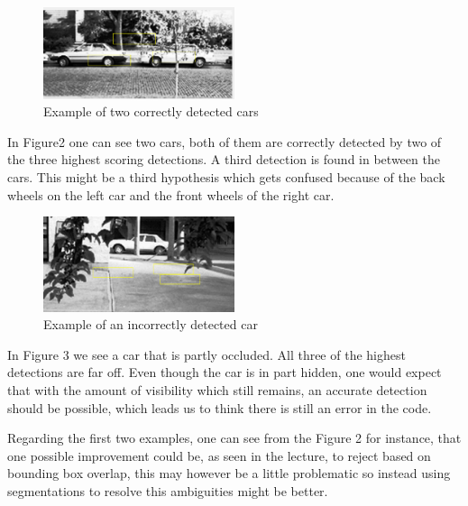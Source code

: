 \documentclass[12pt]{article}
\begin{document}
\begin{figure}[H]
	\begin{center}
	\includegraphics[width=0.5\textwidth]{eva1}
	\caption{Example of two correctly detected cars }
\end{center}
\end{figure}

In Figure2 one can see two cars, both of them are correctly detected by two of the three highest scoring detections. A third detection is found in between the cars. This might be a third hypothesis which gets confused because of the back wheels on the left car and the front wheels of the right car.


\begin{figure}[H]
	\begin{center}
	\includegraphics[width=0.5\textwidth]{eva3}
	\caption{Example of an incorrectly detected car }
\end{center}
\end{figure}

In Figure 3 we see a car that is partly occluded. All three of the highest detections are far off. Even though the car is in part hidden, one would expect that with the amount of visibility which still remains, an accurate detection should be possible, which leads us to think there is still an error in the code.

Regarding the first two examples, one can see from the Figure 2 for instance, that one possible improvement could be, as seen in the lecture, to reject based on bounding box overlap, this may however be a little problematic so instead using segmentations to resolve this ambiguities might be better.
\end{document}
